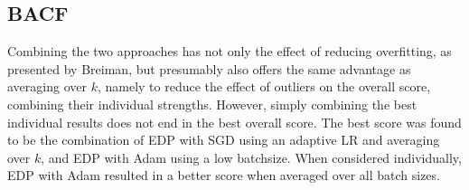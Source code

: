 \subsection{\ac{BACF}}

Combining the two approaches has not only the effect of reducing overfitting, as presented by Breiman\cite{breiman}, but presumably also offers the same advantage as averaging over $k$, namely to reduce the effect of outliers on the overall score, combining their individual strengths. However, simply combining the best individual results does not end in the best overall score. The best score was found to be the combination of \ac{EDP} with \ac{SGD} using an adaptive \ac{LR} and averaging over $k$, and \ac{EDP} with Adam using a low batchsize. When considered individually, \ac{EDP} with Adam resulted in a better score when averaged over all batch sizes.

